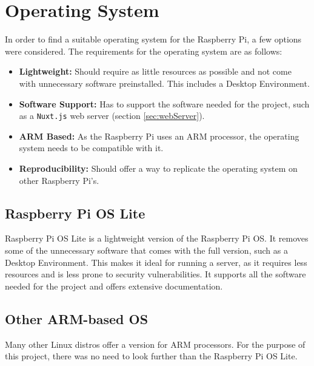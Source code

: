 \section{Operating System}
In order to find a suitable operating system for the Raspberry Pi, a few options
were considered. The requirements for the operating system are as follows:
\begin{itemize}
    \item \textbf{Lightweight:} Should require as little resources as possible
    and not come with unnecessary software preinstalled. This includes a Desktop 
    Environment.
    \item \textbf{Software Support:} Has to support the software needed for the
    project, such as a \texttt{Nuxt.js} web server (section \ref{sec:webServer}).
    \item \textbf{ARM Based:} As the Raspberry Pi uses an ARM processor, the
    operating system needs to be compatible with it.
    \item \textbf{Reproducibility:} Should offer a way to replicate the operating
    system on other Raspberry Pi's.
\end{itemize}
    \subsection{Raspberry Pi OS Lite}
    Raspberry Pi OS Lite is a lightweight version of the Raspberry Pi OS. It
    removes some of the unnecessary software that comes with the full version, such
    as a Desktop Environment. This makes it ideal for running a server, as it
    requires less resources and is less prone to security vulnerabilities.
    It supports all the software needed for the project and offers extensive documentation.
    \subsection{Other ARM-based OS}
    Many other Linux distros offer a version for ARM processors. For the purpose of
    this project, there was no need to look further than the Raspberry Pi OS Lite.